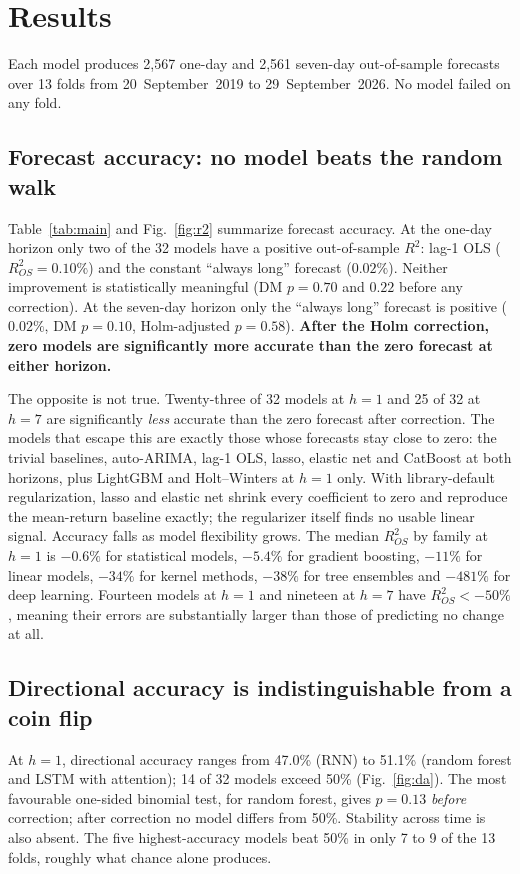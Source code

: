 \section{Results}
\label{sec:results}

Each model produces 2{,}567 one-day and 2{,}561 seven-day out-of-sample forecasts over 13 folds from 20~September~2019 to 29~September~2026. No model failed on any fold.

\subsection{Forecast accuracy: no model beats the random walk}
Table~\ref{tab:main} and Fig.~\ref{fig:r2} summarize forecast accuracy. At the one-day horizon only two of the 32 models have a positive out-of-sample $R^2$: lag-1 OLS ($R^2_{OS} = 0.10\%$) and the constant ``always long'' forecast ($0.02\%$). Neither improvement is statistically meaningful (DM $p = 0.70$ and $0.22$ before any correction). At the seven-day horizon only the ``always long'' forecast is positive ($0.02\%$, DM $p = 0.10$, Holm-adjusted $p = 0.58$). \textbf{After the Holm correction, zero models are significantly more accurate than the zero forecast at either horizon.}

The opposite is not true. Twenty-three of 32 models at $h=1$ and 25 of 32 at $h=7$ are significantly \emph{less} accurate than the zero forecast after correction. The models that escape this are exactly those whose forecasts stay close to zero: the trivial baselines, auto-ARIMA, lag-1 OLS, lasso, elastic net and CatBoost at both horizons, plus LightGBM and Holt--Winters at $h=1$ only. With library-default regularization, lasso and elastic net shrink every coefficient to zero and reproduce the mean-return baseline exactly; the regularizer itself finds no usable linear signal. Accuracy falls as model flexibility grows. The median $R^2_{OS}$ by family at $h=1$ is $-0.6\%$ for statistical models, $-5.4\%$ for gradient boosting, $-11\%$ for linear models, $-34\%$ for kernel methods, $-38\%$ for tree ensembles and $-481\%$ for deep learning. Fourteen models at $h=1$ and nineteen at $h=7$ have $R^2_{OS} < -50\%$, meaning their errors are substantially larger than those of predicting no change at all.

\subsection{Directional accuracy is indistinguishable from a coin flip}
At $h=1$, directional accuracy ranges from 47.0\% (RNN) to 51.1\% (random forest and LSTM with attention); 14 of 32 models exceed 50\% (Fig.~\ref{fig:da}). The most favourable one-sided binomial test, for random forest, gives $p = 0.13$ \emph{before} correction; after correction no model differs from 50\%. Stability across time is also absent. The five highest-accuracy models beat 50\% in only 7 to 9 of the 13 folds, roughly what chance alone produces.

